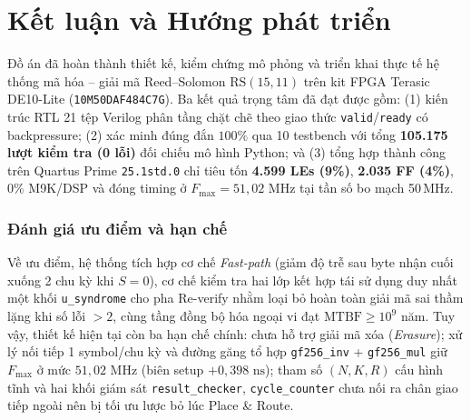 \chapter*{Kết luận và Hướng phát triển}
{}
\label{ch:conclusion}

Đồ án đã hoàn thành thiết kế, kiểm chứng mô phỏng và triển khai thực tế hệ thống mã hóa -- giải mã Reed--Solomon $\mathrm{RS}(15,11)$ trên kit FPGA Terasic DE10-Lite (\texttt{10M50DAF484C7G}). Ba kết quả trọng tâm đã đạt được gồm: (1) kiến trúc RTL 21 tệp Verilog phân tầng chặt chẽ theo giao thức \texttt{valid}/\texttt{ready} có backpressure; (2) xác minh đúng đắn $100\%$ qua 10 testbench với tổng \textbf{105.175 lượt kiểm tra (0 lỗi)} đối chiếu mô hình Python; và (3) tổng hợp thành công trên Quartus Prime \texttt{25.1std.0} chỉ tiêu tốn \textbf{4.599 LEs (9\%)}, \textbf{2.035 FF (4\%)}, $0\%$ M9K/DSP và đóng timing ở $F_{\max} = 51{,}02\text{ MHz}$ tại tần số bo mạch 50\,MHz.

\subsection*{Đánh giá ưu điểm và hạn chế}
Về ưu điểm, hệ thống tích hợp cơ chế \textit{Fast-path} (giảm độ trễ sau byte nhận cuối xuống 2 chu kỳ khi $S=0$), cơ chế kiểm tra hai lớp kết hợp tái sử dụng duy nhất một khối \texttt{u\_syndrome} cho pha Re-verify nhằm loại bỏ hoàn toàn giải mã sai thầm lặng khi số lỗi $>2$, cùng tầng đồng bộ hóa ngoại vi đạt $\text{MTBF} \ge 10^9$ năm. Tuy vậy, thiết kế hiện tại còn ba hạn chế chính: chưa hỗ trợ giải mã xóa (\textit{Erasure}); xử lý nối tiếp 1 symbol/chu kỳ và đường găng tổ hợp \texttt{gf256\_inv} + \texttt{gf256\_mul} giữ $F_{\max}$ ở mức $51{,}02\text{ MHz}$ (biên setup $+0{,}398\text{ ns}$); tham số $(N,K,R)$ cấu hình tĩnh và hai khối giám sát \texttt{result\_checker}, \texttt{cycle\_counter} chưa nối ra chân giao tiếp ngoài nên bị tối ưu lược bỏ lúc Place \& Route.

